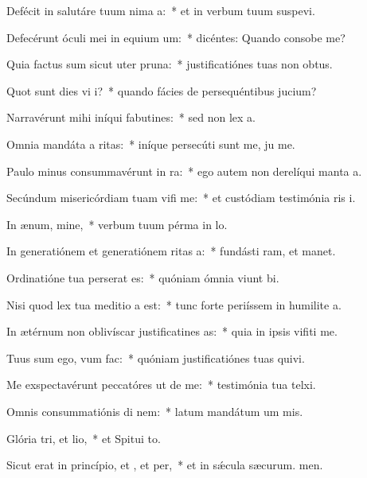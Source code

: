 \item Defécit in salutáre tuum nima a:~* et in verbum tuum suspevi.
\item Defecérunt óculi mei in equium um:~* dicéntes: Quando consobe me?
\item Quia factus sum sicut uter  pruna:~* justificatiónes tuas non  obtus.
\item Quot sunt dies vi i?~* quando fácies de persequéntibus  jucium?
\item Narravérunt mihi iníqui fabutines:~* sed non  lex a.
\item Omnia mandáta a ritas:~* iníque persecúti sunt me, ju me.
\item Paulo minus consummavérunt  in ra:~* ego autem non derelíqui manta a.
\item Secúndum misericórdiam tuam vifi me:~* et custódiam testimónia ris i.
\item In ænum, mine,~* verbum tuum pérma in lo.
\item In generatiónem et generatiónem ritas a:~* fundásti ram, et manet.
\item Ordinatióne tua perserat es:~* quóniam ómnia viunt bi.
\item Nisi quod lex tua meditio a est:~* tunc forte periíssem in humilite a.
\item In ætérnum non oblivíscar justificatines as:~* quia in ipsis vifiti me.
\item Tuus sum ego, vum  fac:~* quóniam justificatiónes tuas quivi.
\item Me exspectavérunt peccatóres ut de me:~* testimónia tua telxi.
\item Omnis consummatiónis di nem:~* latum mandátum um mis.
\item Glória tri, et lio,~* et Spitui to.
\item Sicut erat in princípio, et , et per,~* et in sǽcula sæcurum. men.
